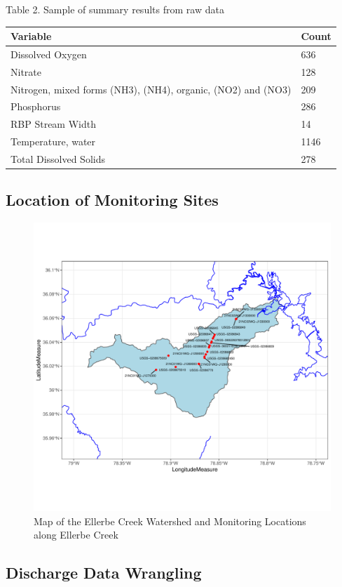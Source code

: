 \documentclass[12pt,]{article}
\begin{document}
Table 2. Sample of summary results from raw data

\begin{longtable}[]{@{}ll@{}}
\toprule
Variable & Count\tabularnewline
\midrule
\endhead
Dissolved Oxygen & 636\tabularnewline
Nitrate & 128\tabularnewline
Nitrogen, mixed forms (NH3), (NH4), organic, (NO2) and (NO3) &
209\tabularnewline
Phosphorus & 286\tabularnewline
RBP Stream Width & 14\tabularnewline
Temperature, water & 1146\tabularnewline
Total Dissolved Solids & 278\tabularnewline
\bottomrule
\end{longtable}

\hypertarget{location-of-monitoring-sites}{%
\subsection{Location of Monitoring
Sites}\label{location-of-monitoring-sites}}

\begin{figure}
\centering
\includegraphics{Landman_ENV872_Project_files/figure-latex/Exploratory Analysis Figure 1-1.pdf}
\caption{Map of the Ellerbe Creek Watershed and Monitoring Locations
along Ellerbe Creek}
\end{figure}

\newpage

\hypertarget{discharge-data-wrangling}{%
\subsection{Discharge Data Wrangling}\label{discharge-data-wrangling}}
\end{document}
